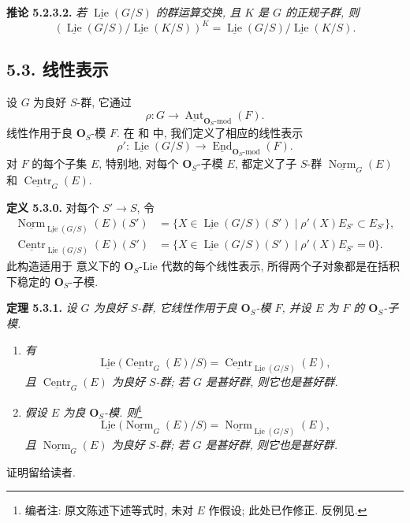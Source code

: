 \medskip
\noindent{}\textbf{推论 5.2.3.2.}
\textit{若 \(\underline{\operatorname{Lie}}(G/S)\) 的群运算交换,
且 \(K\) 是 \(G\) 的正规子群, 则}
\[
 \left(
 \underline{\operatorname{Lie}}(G/S)/
 \underline{\operatorname{Lie}}(K/S)
 \right)^K
 =
 \underline{\operatorname{Lie}}(G/S)/
 \underline{\operatorname{Lie}}(K/S).
\]

\subsection*{5.3. 线性表示}

设 \(G\) 为良好 \(S\)-群, 它通过
\[
 \rho:G\longrightarrow
 \underline{\operatorname{Aut}}_{\mathbf O_S\text{-}\mathrm{mod}}(F).
\]
线性作用于良 \(\mathbf O_S\)-模 \(F\).
在 和 中,
我们定义了相应的线性表示
\[
 \rho':
 \underline{\operatorname{Lie}}(G/S)
 \longrightarrow
 \underline{\operatorname{End}}_{\mathbf O_S\text{-}\mathrm{mod}}(F).
\]
对 \(F\) 的每个子集 \(E\), 特别地, 对每个
\(\mathbf O_S\)-子模 \(E\), 都定义了子 \(S\)-群
\(\underline{\operatorname{Norm}}_G(E)\) 和
\(\underline{\operatorname{Centr}}_G(E)\).

\medskip
\noindent{}\textbf{定义 5.3.0.}
对每个 \(S'\to S\), 令
\[
\begin{split}
 \underline{\operatorname{Norm}}_{\underline{\operatorname{Lie}}(G/S)}
   (E)(S')
 &=\{X\in\underline{\operatorname{Lie}}(G/S)(S')
      \mid \rho'(X)E_{S'}\subset E_{S'}\},\\
 \underline{\operatorname{Centr}}_{\underline{\operatorname{Lie}}(G/S)}
   (E)(S')
 &=\{X\in\underline{\operatorname{Lie}}(G/S)(S')
      \mid \rho'(X)E_{S'}=0\}.
\end{split}
\]
此构造适用于 意义下的
\(\mathbf O_S\)-Lie 代数的每个线性表示,
所得两个子对象都是在括积下稳定的 \(\mathbf O_S\)-子模.

\medskip
\noindent{}\textbf{定理 5.3.1.}
\textit{设 \(G\) 为良好 \(S\)-群, 它线性作用于良
\(\mathbf O_S\)-模 \(F\), 并设 \(E\) 为 \(F\) 的
\(\mathbf O_S\)-子模.}
\begin{enumerate}
\renewcommand{\labelenumi}{(\roman{enumi})}
\item \textit{有}
\[
 \underline{\operatorname{Lie}}
   \bigl(\underline{\operatorname{Centr}}_G(E)/S\bigr)
 =
 \underline{\operatorname{Centr}}_
   {\underline{\operatorname{Lie}}(G/S)}(E),
\]
\textit{且 \(\underline{\operatorname{Centr}}_G(E)\) 为良好
\(S\)-群; 若 \(G\) 是甚好群, 则它也是甚好群.}
\item \textit{假设 \(E\) 为良 \(\mathbf O_S\)-模. 则}\footnote{编者注: 原文陈述下述等式时, 未对 \(E\) 作假设;
此处已作修正. 反例见.}
\[
 \underline{\operatorname{Lie}}
   \bigl(\underline{\operatorname{Norm}}_G(E)/S\bigr)
 =
 \underline{\operatorname{Norm}}_
   {\underline{\operatorname{Lie}}(G/S)}(E),
\]
\textit{且 \(\underline{\operatorname{Norm}}_G(E)\) 为良好
\(S\)-群; 若 \(G\) 是甚好群, 则它也是甚好群.}
\end{enumerate}
证明留给读者.

